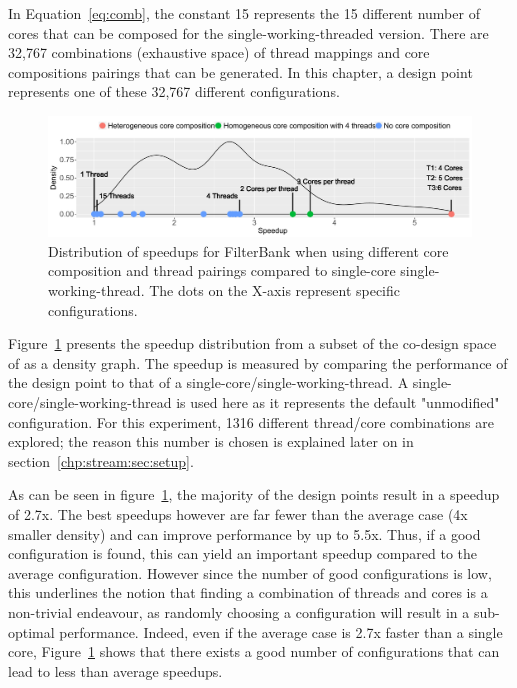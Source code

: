 In Equation~\ref{eq:comb}, the constant 15 represents the 15 different number of cores that can be composed for the single-working-threaded version.
There are 32,767 combinations (exhaustive space) of thread mappings and core compositions pairings that can be generated.
In this chapter, a design point represents one of these 32,767 different configurations.

\begin{figure}[t]
    \centering
    \includegraphics[width=1\textwidth]{streamit-paper/graphics/filterbank_motivation_4.pdf}
    \caption{Distribution of speedups for FilterBank when using different core composition and thread pairings compared to single-core single-working-thread. The dots on the X-axis represent specific configurations.}
     \label{fig:threadcoremotiv}
	 \vspace{-1em}
\end{figure}

Figure~\ref{fig:threadcoremotiv} presents the speedup distribution from a subset of the co-design space of  as a density graph.
The speedup is measured by comparing the performance of the design point to that of a single-core/single-working-thread.
A single-core/single-working-thread is used here as it represents the default "unmodified" configuration.
For this experiment, 1316 different thread/core combinations are explored; the reason this number is chosen is explained later on in section~\ref{chp:stream:sec:setup}.

As can be seen in figure~\ref{fig:threadcoremotiv}, the majority of the design points result in a speedup of 2.7x.
The best speedups however are far fewer than the average case (4x smaller density) and can improve performance by up to 5.5x.
Thus, if a good configuration is found, this can yield an important speedup compared to the average configuration.
However since the number of good configurations is low, this underlines the notion that finding a combination of threads and cores is a non-trivial endeavour, as randomly choosing a configuration will result in a sub-optimal performance.
Indeed, even if the average case is 2.7x faster than a single core, Figure~\ref{fig:threadcoremotiv} shows that there exists a good number of configurations that can lead to less than average speedups.

